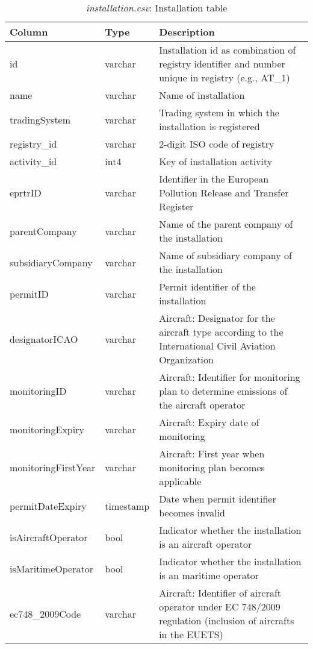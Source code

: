 \documentclass[authoryear]{elsarticle}
\begin{document}
\begin{table}[tbp]\scriptsize
	\caption{\textit{installation.csv}: Installation table}\label{tab:tbl_installation}
	\centering
	\begin{tabular*}{\textwidth}{@{}@{\extracolsep{\fill}} llp{8cm} @{}}
		\toprule
		\toprule
		\textbf{Column} & \textbf{Type}  & \textbf{Description} \\
		\midrule
		id    & varchar & Installation id as combination of registry identifier and number unique in registry (e.g., AT\_1) \\
		name  & varchar & Name of installation \\
		tradingSystem & varchar & Trading system in which the installation is registered\\
		registry\_id & varchar & 2-digit ISO code of registry  \\
		activity\_id & int4  & Key of installation activity  \\
		eprtrID & varchar & Identifier in the European Pollution Release and Transfer Register \\
		parentCompany & varchar & Name of the parent company of the installation \\
		subsidiaryCompany & varchar & Name of subsidiary company of the installation \\
		permitID & varchar & Permit identifier of the installation \\
		designatorICAO & varchar & Aircraft: Designator for the aircraft type according to the International Civil Aviation Organization \\
		monitoringID & varchar & Aircraft: Identifier for monitoring plan to determine emissions of the aircraft operator \\
		monitoringExpiry & varchar & Aircraft: Expiry date of monitoring  \\
		monitoringFirstYear & varchar & Aircraft: First year when monitoring plan becomes applicable \\
		permitDateExpiry & timestamp & Date when permit identifier becomes invalid \\
		isAircraftOperator & bool  & Indicator whether the installation is an aircraft operator \\
		isMaritimeOperator & bool  & Indicator whether the installation is an maritime operator \\
		ec748\_2009Code & varchar & Aircraft: Identifier of aircraft operator under EC 748/2009 regulation (inclusion of aircrafts in the EUETS) \\

\end{tabular*}
\end{table}
\end{document}
